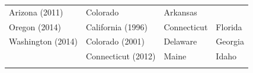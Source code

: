 \documentclass[11pt,]{article}
\begin{document}
\begin{longtable}[]{@{}llll@{}}
\begin{minipage}[t]{0.26\columnwidth}
Arizona (2011)\strut
\end{minipage} & \begin{minipage}[t]{0.24\columnwidth}\raggedright
Colorado\strut
\end{minipage} & \begin{minipage}[t]{0.19\columnwidth}\raggedright
Arkansas\strut
\end{minipage}\tabularnewline
\begin{minipage}[t]{0.20\columnwidth}\raggedright
Oregon (2014)\strut
\end{minipage} & \begin{minipage}[t]{0.26\columnwidth}\raggedright
California (1996)\strut
\end{minipage} & \begin{minipage}[t]{0.24\columnwidth}\raggedright
Connecticut\strut
\end{minipage} & \begin{minipage}[t]{0.19\columnwidth}\raggedright
Florida\strut
\end{minipage}\tabularnewline
\begin{minipage}[t]{0.20\columnwidth}\raggedright
Washington (2014)\strut
\end{minipage} & \begin{minipage}[t]{0.26\columnwidth}\raggedright
Colorado (2001)\strut
\end{minipage} & \begin{minipage}[t]{0.24\columnwidth}\raggedright
Delaware\strut
\end{minipage} & \begin{minipage}[t]{0.19\columnwidth}\raggedright
Georgia\strut
\end{minipage}\tabularnewline
\begin{minipage}[t]{0.20\columnwidth}\raggedright
\strut
\end{minipage} & \begin{minipage}[t]{0.26\columnwidth}\raggedright
Connecticut (2012)\strut
\end{minipage} & \begin{minipage}[t]{0.24\columnwidth}\raggedright
Maine\strut
\end{minipage} & \begin{minipage}[t]{0.19\columnwidth}\raggedright
Idaho\strut
\end{minipage}\tabularnewline
\begin{minipage}[t]{0.20\columnwidth}\raggedright
\strut
\end{minipage} & \begin{minipage}[t]{0.26\columnwidth}\raggedright

\end{minipage}
\end{longtable}
\end{document}
